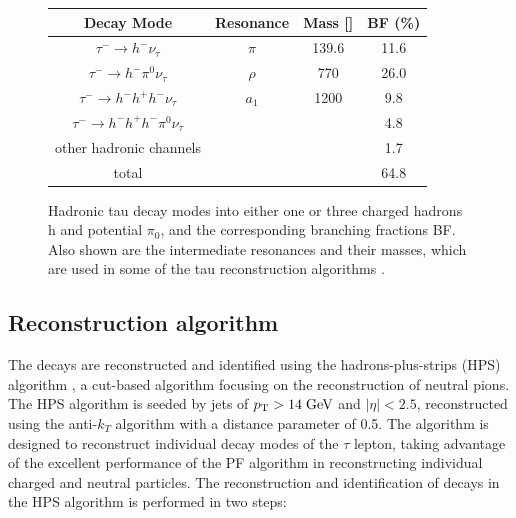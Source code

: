\begin{figure}[tbh!]
	\begin{center}	
		\begin{tabular}{ | c | c | c | c |}
			\hline
			Decay Mode & Resonance & Mass [\mev] & BF (\%) \\ \hline
			\hline
			$\tau^{-}\longrightarrow h^{-}\nu_{\tau}$& $\pi$ & 139.6 & 11.6 \\ \hline
			$\tau^{-}\longrightarrow h^{-}\pi^{0}\nu_{\tau}$& $\rho$ & 770 & 26.0 \\ \hline
			$\tau^{-}\longrightarrow h^{-} h^{+} h^{-} \nu_{\tau}$& $a_{1}$& 1200 & 9.8 \\ \hline
			$\tau^{-}\longrightarrow h^{-} h^{+} h^{-} \pi^{0}\nu_{\tau}$& & & 4.8 \\ \hline
			other hadronic channels& & & 1.7 \\ \hline
			\hline
			total & & & 64.8 \\ \hline
			\hline
		\end{tabular}
		\caption{ Hadronic tau decay modes into either one or three charged hadrons h and potential $\pi_{0}$, and the corresponding branching fractions BF. Also shown are the intermediate resonances and their masses, which are used in some of the tau reconstruction algorithms \cite{Agashe:2014kda}.}
		\label{table:tau_hdecay}
	\end{center}
\end{figure}

\subsection{Reconstruction algorithm}
The \hadtau decays are reconstructed and identified using the hadrons-plus-strips (HPS) algorithm \cite{Chatrchyan:2012zz}, a cut-based algorithm focusing on the reconstruction of neutral pions. The HPS algorithm is seeded by jets of \ensuremath{\pt > 14 \gev} and \ensuremath{|\eta| < 2.5}, reconstructed using the anti-\ensuremath{k_{T}} algorithm \cite{antikt} with a distance parameter of 0.5. The algorithm is designed to reconstruct individual decay modes of the \ensuremath{\tau} lepton, taking advantage of the excellent performance of the PF algorithm in reconstructing individual charged and neutral particles.
The reconstruction and identification of \hadtau decays in the HPS algorithm is performed in two steps:

